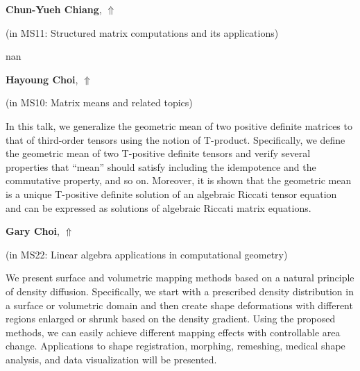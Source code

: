 \documentclass[ILAS2025-program.tex]{subfiles}
\begin{document}
     \hypertarget{down0268}{}\begin{ilasabstract}
    
    \textbf{Chun-Yueh Chiang},  \hfill \hyperlink{up0268}{$\Uparrow$}
    
    (in {\color{mstitle}MS11: Structured matrix computations and its applications})
        
        \mtskip
    nan\end{ilasabstract}
     \hypertarget{down0024}{}\begin{ilasabstract}
    
    \textbf{Hayoung Choi},  \hfill \hyperlink{up0024}{$\Uparrow$}
    
    (in {\color{mstitle}MS10: Matrix means and related topics})
        
        \mtskip
    In this talk, we generalize the geometric mean of two positive definite matrices to that of third-order tensors using the notion of T-product. Specifically, we define the geometric mean of two T-positive definite tensors and verify several properties that ``mean'' should satisfy including the idempotence and the commutative property, and so on. Moreover, it is shown that the geometric mean is a unique T-positive definite solution of an algebraic Riccati tensor equation and can be expressed as solutions of algebraic Riccati matrix equations. 
\end{ilasabstract}
     \hypertarget{down0034}{}\begin{ilasabstract}
    
    \textbf{Gary Choi},  \hfill \hyperlink{up0034}{$\Uparrow$}
    
    (in {\color{mstitle}MS22: Linear algebra applications in computational geometry})
        
        \mtskip
    We present surface and volumetric mapping methods based on a natural principle of density diffusion. Specifically, we start with a prescribed density distribution in a surface or volumetric domain and then create shape deformations with different regions enlarged or shrunk based on the density gradient. Using the proposed methods, we can easily achieve different mapping effects with controllable area change. Applications to shape registration, morphing, remeshing, medical shape analysis, and data visualization will be presented. 
\end{ilasabstract}
\end{document}
